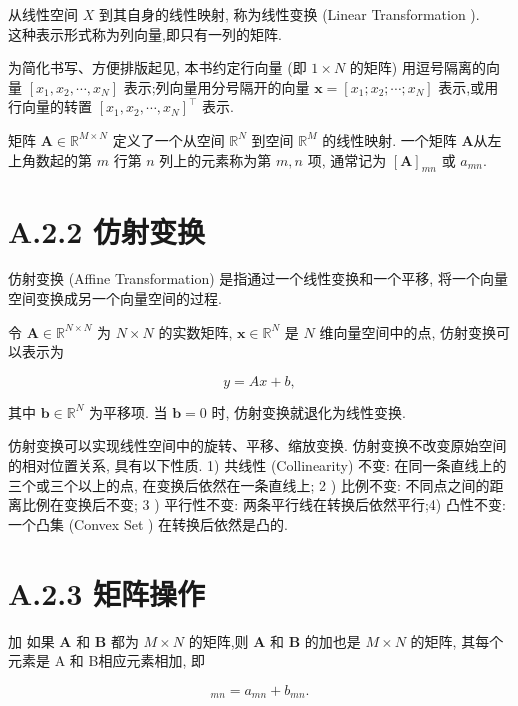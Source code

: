 \documentclass[10pt]{article}
\begin{document}
从线性空间 $X$ 到其自身的线性映射, 称为线性变换 (Linear Transformation ).\\
这种表示形式称为列向量,即只有一列的矩阵.

为简化书写、方便排版起见, 本书约定行向量 (即 $1 \times N$ 的矩阵) 用逗号隔离的向量 $\left[x_{1}, x_{2}, \cdots, x_{N}\right]$ 表示;列向量用分号隔开的向量 $\boldsymbol{x}=\left[x_{1} ; x_{2} ; \cdots ; x_{N}\right]$ 表示,或用行向量的转置 $\left[x_{1}, x_{2}, \cdots, x_{N}\right]^{\top}$ 表示.

矩阵 $\boldsymbol{A} \in \mathbb{R}^{M \times N}$ 定义了一个从空间 $\mathbb{R}^{N}$ 到空间 $\mathbb{R}^{M}$ 的线性映射. 一个矩阵 $\boldsymbol{A}$从左上角数起的第 $m$ 行第 $n$ 列上的元素称为第 $m, n$ 项, 通常记为 $[\boldsymbol{A}]_{m n}$ 或 $a_{m n}$.

\section*{A.2.2 仿射变换}
仿射变换 (Affine Transformation) 是指通过一个线性变换和一个平移, 将一个向量空间变换成另一个向量空间的过程.

令 $\boldsymbol{A} \in \mathbb{R}^{N \times N}$ 为 $N \times N$ 的实数矩阵, $\boldsymbol{x} \in \mathbb{R}^{N}$ 是 $N$ 维向量空间中的点, 仿射变换可以表示为


\begin{equation*}
y=A x+b, \tag{A.20}
\end{equation*}


其中 $\boldsymbol{b} \in \mathbb{R}^{N}$ 为平移项. 当 $\boldsymbol{b}=0$ 时, 仿射变换就退化为线性变换.

仿射变换可以实现线性空间中的旋转、平移、缩放变换. 仿射变换不改变原始空间的相对位置关系, 具有以下性质. 1) 共线性 (Collinearity) 不变: 在同一条直线上的三个或三个以上的点, 在变换后依然在一条直线上; 2 ) 比例不变: 不同点之间的距离比例在变换后不变; 3 ) 平行性不变: 两条平行线在转换后依然平行;4) 凸性不变:一个凸集 (Convex Set ) 在转换后依然是凸的.

\section*{A.2.3 矩阵操作}
加 如果 $\boldsymbol{A}$ 和 $\boldsymbol{B}$ 都为 $M \times N$ 的矩阵,则 $\boldsymbol{A}$ 和 $\boldsymbol{B}$ 的加也是 $M \times N$ 的矩阵, 其每个元素是 $\mathrm{A}$ 和 B相应元素相加, 即


\begin{equation*}
[\boldsymbol{A}+\boldsymbol{B}]_{m n}=a_{m n}+b_{m n} . \tag{A.21}
\end{equation*}
\end{document}
